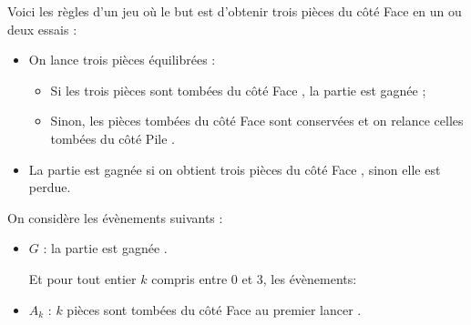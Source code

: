 \documentclass[10pt]{article}
\begin{document}
Voici les règles d'un jeu où le but est d'obtenir trois pièces du côté \og Face \fg{} en un ou deux essais :

\begin{itemize}[label=$\bullet~$]
\item On lance trois pièces équilibrées :
	\begin{itemize}[label=$\circ~$]
	\item Si les trois pièces sont tombées du côté \og Face \fg, la partie est gagnée ;
	\item Sinon, les pièces tombées du côté \og Face\fg{} sont conservées et on relance
celles tombées du côté \og Pile \fg.
	\end{itemize}
\item La partie est gagnée si on obtient trois pièces du côté \og Face \fg, sinon elle est
perdue.
\end{itemize}

On considère les évènements suivants :
\begin{itemize}[label=$\bullet~$]
\item $G$ : \og la partie est gagnée \fg.

Et pour tout entier $k$ compris entre 0 et 3, les évènements:
\item $A_k$ : \og $k$ pièces sont tombées du côté \og Face\fg{} au premier lancer \fg.
\end{itemize}

\medskip
\end{document}
